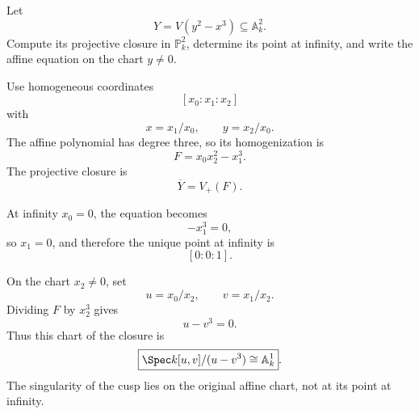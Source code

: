 \begin{problem}\label{prob:vi37-17}
Let
\[
Y=V(y^2-x^3)\subseteq\mathbb A^2_k.
\]
Compute its projective closure in \(\mathbb P^2_k\), determine its point at infinity, and write the affine equation on the chart \(y\neq0\).

\end{problem}

\ifdefined\FullProblemDossiers
\begin{solution}
Use homogeneous coordinates
\[
[x_0:x_1:x_2]
\]
with
\[
x=x_1/x_0,\qquad y=x_2/x_0.
\]
The affine polynomial has degree three, so its homogenization is
\[
\boxed{
F=x_0x_2^2-x_1^3.
}
\]
The projective closure is
\[
\overline Y=V_+(F).
\]

At infinity \(x_0=0\), the equation becomes
\[
-x_1^3=0,
\]
so \(x_1=0\), and therefore the unique point at infinity is
\[
\boxed{[0:0:1]}.
\]

On the chart \(x_2\neq0\), set
\[
u=x_0/x_2,\qquad v=x_1/x_2.
\]
Dividing \(F\) by \(x_2^3\) gives
\[
u-v^3=0.
\]
Thus this chart of the closure is
\[
\boxed{\Spec k[u,v]/(u-v^3)\cong\mathbb A^1_k}.
\]
The singularity of the cusp lies on the original affine chart, not at its point at infinity.
\end{solution}
\fi
